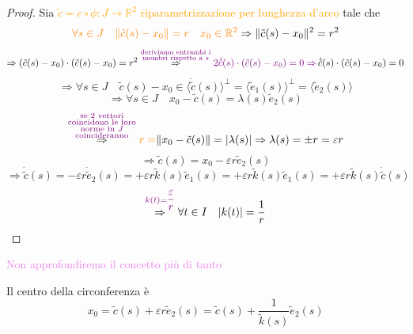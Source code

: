 \begin{proof}
        Sia \textcolor{orange}{$\tilde{c}= c \circ \phi \colon J \to \mathbb{R}^2$ riparametrizzazione per lunghezza d'arco} tale che 
        \[ \textcolor{orange}{\forall s \in J \quad \lVert \tilde{c}(s) -x_0\rVert=r \quad x_0 \in \mathbb{R}^2} \Rightarrow \lVert \tilde{c}(s) -x_0\rVert^2=r^2 \]
        \[ \Rightarrow \left( \tilde{c}(s) - x_0 \right) \cdot \left( \tilde{c}(s) - x_0 \right) = r^2 \overset{\textcolor{violet}{\substack{\text{deriviamo entrambi i} \\ \text{membri rispetto a } s}}}{\Rightarrow} \textcolor{violet}{2 \dot{\tilde{c}}(s) \cdot (\tilde{c}(s) - x_0) = 0 \Rightarrow} \, \dot{\tilde{c}}(s) \cdot \left( \tilde{c}(s) - x_0 \right) = 0 \]
        \[ \Rightarrow \forall s \in J \quad \tilde{c}(s) -x_0 \in \langle \dot{\tilde{c}}(s) \rangle^\perp = \langle \tilde{e}_1(s) \rangle^\perp = \langle \tilde{e}_2(s) \rangle \]
        \[ \Rightarrow \forall s \in J \quad  x_0 - \tilde{c}(s) = \lambda(s) \tilde{e}_2(s) \]
        \[ \overset{\textcolor{violet}{\substack{\text{se 2 vettori} \\ \text{coincidono le loro} \\ \text{norme in } J \\ \text{coincideranno} }}}{\Rightarrow} \textcolor{orange}{r=} \lVert x_0 - \tilde{c}(s)\rVert = \lvert\lambda(s)\rvert \Rightarrow \lambda(s) = \pm r = \varepsilon r \]
        \[ \Rightarrow \tilde{c}(s)=x_0 - \varepsilon r \tilde{e}_2(s) \]
        \[ \Rightarrow \dot{\tilde{c}}(s) = - \varepsilon r \dot{\tilde{e}}_2(s) = + \varepsilon r \tilde{k}(s) \tilde{e}_1(s) = + \varepsilon r \tilde{k}(s) \tilde{e}_1(s) = + \varepsilon r \tilde{k}(s) \dot{\tilde{c}}(s) \]
        \[ \overset{\textcolor{violet}{k(t)=\dfrac{\varepsilon}{r}}}{\Rightarrow} \forall t \in I \quad \lvert k(t)\rvert= \frac{1}{r} \]
        \end{proof}
        \begin{osservazione}
        \textcolor{violet}{Non approfondiremo il concetto più di tanto}

        Il centro della circonferenza è
        \[ x_0 = \tilde{c}(s) + \varepsilon r \tilde{e}_2(s) = \tilde{c}(s) + \frac{1}{\tilde{k}(s)} \tilde{e}_2(s) \]
        \end{osservazione}
